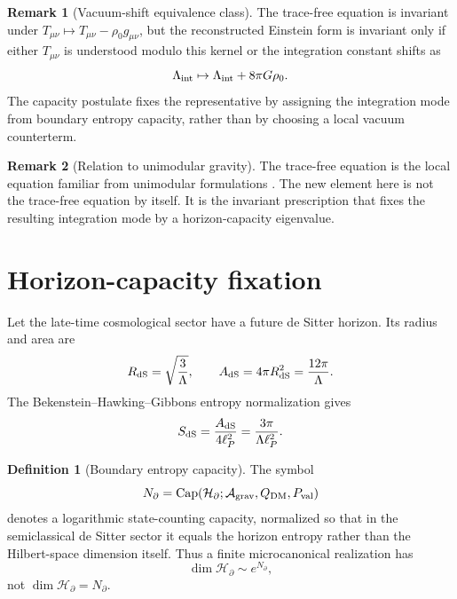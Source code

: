 \documentclass[aps,prd,reprint,nofootinbib,superscriptaddress]{revtex4-2}
\numberwithin{equation}{section}
\theoremstyle{definition}
\newtheorem{definition}{Definition}[section]
\newtheorem{remark}{Remark}[section]
\theoremstyle{plain}
\newcommand{\Agrav}{\mathcal A_{\rm grav}}
\newcommand{\Ncap}{N_{\partial}}
\newcommand{\Capacity}{\operatorname{Cap}}
\begin{document}
\begin{remark}[Vacuum-shift equivalence class]
The trace-free equation is invariant under \(T_{\mu\nu}\mapsto T_{\mu\nu}-\rho_0g_{\mu\nu}\), but the reconstructed Einstein form is invariant only if either \(T_{\mu\nu}\) is understood modulo this kernel or the integration constant shifts as
\[
\Lambda_{\rm int}\mapsto\Lambda_{\rm int}+8\pi G\rho_0 .
\]
The capacity postulate fixes the representative by assigning the integration mode from boundary entropy capacity, rather than by choosing a local vacuum counterterm.
\end{remark}

\begin{remark}[Relation to unimodular gravity]
The trace-free equation is the local equation familiar from unimodular formulations \cite{AndersonFinkelstein1971,Unruh1989,HenneauxTeitelboim1989,Weinberg1989}.  The new element here is not the trace-free equation by itself.  It is the invariant prescription that fixes the resulting integration mode by a horizon-capacity eigenvalue.
\end{remark}

\section{Horizon-capacity fixation}

Let the late-time cosmological sector have a future de Sitter horizon.  Its radius and area are
\begin{equation}
R_{\rm dS}=\sqrt{\frac3{\Lambda}},
\qquad
A_{\rm dS}=4\pi R_{\rm dS}^2=\frac{12\pi}{\Lambda}.
\end{equation}
The Bekenstein--Hawking--Gibbons entropy normalization gives \cite{Bekenstein1973,Hawking1975,GibbonsHawking1977}
\begin{equation}
S_{\rm dS}=\frac{A_{\rm dS}}{4\ell_P^2}
=
\frac{3\pi}{\Lambda\ell_P^2}.
\end{equation}

\begin{definition}[Boundary entropy capacity]\label{def:entropy-capacity}
The symbol
\[
\Ncap=\Capacity(\mathcal H_\partial;\Agrav,Q_{\rm DM},P_{\rm val})
\]
denotes a logarithmic state-counting capacity, normalized so that in the semiclassical de Sitter sector it equals the horizon entropy rather than the Hilbert-space dimension itself.  Thus a finite microcanonical realization has
\[
\dim\mathcal H_\partial\sim e^{\Ncap},
\]
not \(\dim\mathcal H_\partial=\Ncap\).
\end{definition}
\end{document}
